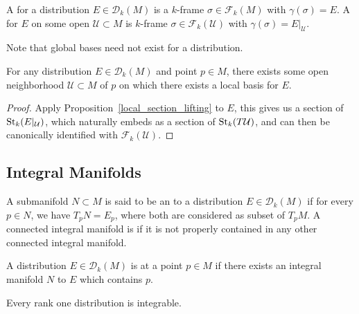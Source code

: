 \documentclass{lkx_paper}
\begin{document}
\begin{definition}
	A  for a distribution $E\in \mathscr{D}_k(M)$ is a $k$-frame $\sigma\in \mathscr{F}_k(M)$ with $\gamma(\sigma)=E$. A  for $E$ on some open $\mathcal{U}\subset M$ is $k$-frame $\sigma\in \mathscr{F}_k(\mathcal{U})$ with $\gamma(\sigma)=E|_\mathcal{U}$.
\end{definition}

Note that global bases need not exist for a distribution.

\begin{example}
\end{example}

\begin{proposition}
	For any distribution $E\in \mathscr{D}_k(M)$ and point $p\in M$, there exists some open neighborhood $\mathcal{U}\subset M$ of $p$ on which there exists a local basis for $E$.
\end{proposition}

\begin{proof}
	Apply Proposition~\ref{local_section_lifting} to $E$, this gives us a section of $\mathrm{St}_k(E|_\mathcal{U})$, which naturally embeds as a section of $\mathrm{St}_k(T\mathcal{U})$, and can then be canonically identified with $\mathcal{F}_k(\mathcal{U})$.
\end{proof}

\subsection{Integral Manifolds}

\begin{definition}
	A submanifold $N\subset M$ is said to be an  to a distribution $E\in \mathscr{D}_k(M)$ if for every $p\in N$, we have $T_p N = E_p$, where both are considered as subset of $T_p M$. A connected integral manifold is  if it is not properly contained in any other connected integral manifold.
\end{definition}

\begin{definition}
	A distribution $E \in \mathscr{D}_k(M)$ is  at a point $p\in M$ if there exists an integral manifold $N$ to $E$ which contains $p$.
\end{definition}

\begin{proposition}
	Every rank one distribution is integrable.
\end{proposition}
\end{document}
